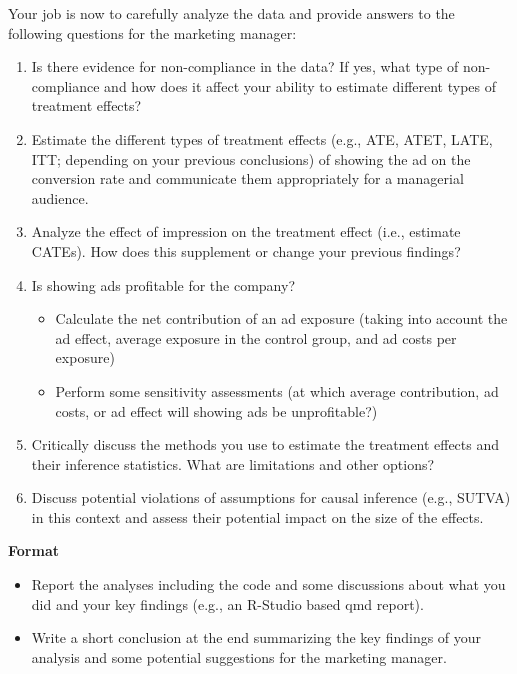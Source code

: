 \documentclass[10pt]{article}
\begin{document}
Your job is now to carefully analyze the data and provide answers to the following questions for
the marketing manager:
\begin{enumerate}
    \item Is there evidence for non-compliance in the data? If yes, what type of non-compliance
    and how does it affect your ability to estimate different types of treatment effects?
    \item Estimate the different types of treatment effects (e.g., ATE, ATET, LATE, ITT; depending
    on your previous conclusions) of showing the ad on the conversion rate and
    communicate them appropriately for a managerial audience.
    \item Analyze the effect of impression on the treatment effect (i.e., estimate CATEs). How
    does this supplement or change your previous findings?
    \item Is showing ads profitable for the company?
    \begin{itemize}
        \item Calculate the net contribution of an ad exposure (taking into account the ad
        effect, average exposure in the control group, and ad costs per exposure)
        \item Perform some sensitivity assessments (at which average contribution, ad costs,
        or ad effect will showing ads be unprofitable?)
    \end{itemize}
    \item Critically discuss the methods you use to estimate the treatment effects and their
    inference statistics. What are limitations and other options?
    \item Discuss potential violations of assumptions for causal inference (e.g., SUTVA) in this
    context and assess their potential impact on the size of the effects.
\end{enumerate}
\newpage 
\textbf{Format}
\begin{itemize}
    \item Report the analyses including the code and some discussions about what you did and
    your key findings (e.g., an R-Studio based qmd report).
    \item Write a short conclusion at the end summarizing the key findings of your analysis and
    some potential suggestions for the marketing manager.
\end{itemize}
\end{document}

